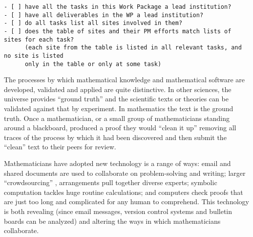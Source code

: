 \begin{draft}
\begin{verbatim}
- [ ] have all the tasks in this Work Package a lead institution?
- [ ] have all deliverables in the WP a lead institution?
- [ ] do all tasks list all sites involved in them? 
- [ ] does the table of sites and their PM efforts match lists of sites for each task?
      (each site from the table is listed in all relevant tasks, and no site is listed
      only in the table or only at some task)
\end{verbatim}
\end{draft}



\begin{workpackage}[id=social-aspects,wphases=0-48,
  title=Social Aspects,
  lead=UO,
  UORM=27,USHRM=8, USORM=6]


\begin{wpobjectives}

The processes by which mathematical knowledge and mathematical
software are developed, validated and applied are quite
distinctive. In other sciences, the universe provides ``ground truth''
and the scientific texts or theories can be validated against that by
experiment. In mathematics the text is the ground truth. Once a
mathematician, or a small group of mathematicians standing around a
blackboard, produced a proof they would ``clean it up'' removing all
traces of the process by which it had been discovered and then submit
the ``clean'' text to their peers for review.

Mathematicians have adopted new technology is a range of ways: email
and shared documents are used to collaborate on problem-solving and
writing; larger ``crowdsourcing'' \cite{polymath_SIAM, PolymathBlog},
arrangements pull together diverse experts; symbolic computation
tackles huge routine calculations; and computers check proofs that are
just too long and complicated for any human to comprehend. This
technology is both revealing (since email messages, version control
systems and bulletin boards can be analyzed) and altering the ways in
which mathematicians collaborate.


\end{wpobjectives}
\end{workpackage}
